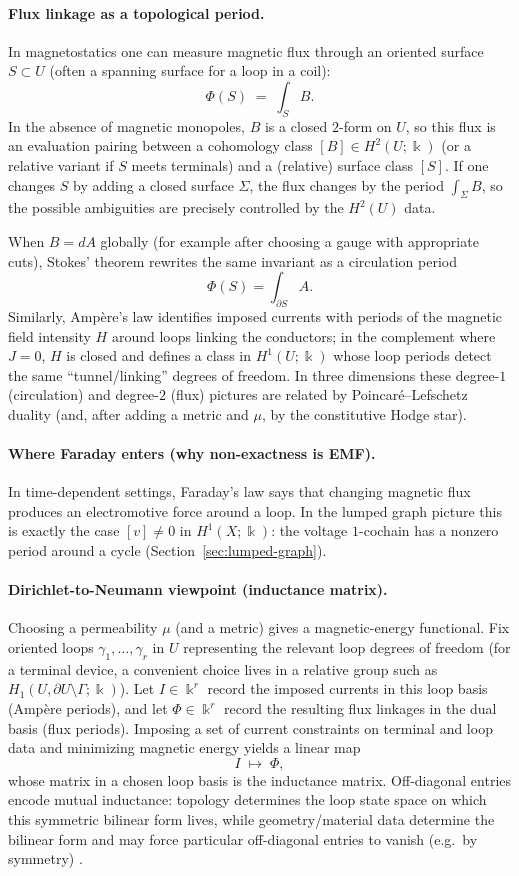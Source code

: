 \documentclass[11pt]{article}
\begin{document}
\paragraph{Flux linkage as a topological period.}
In magnetostatics one can measure magnetic flux through an oriented surface $S\subset U$ (often a spanning surface for a loop in a coil):
\[
\Phi(S)\;=\;\int_{S} B.
\]
In the absence of magnetic monopoles, $B$ is a closed $2$-form on $U$, so this flux is an evaluation pairing between a cohomology class $[B]\in H^2(U;\Bbbk)$ (or a relative variant if $S$ meets terminals) and a (relative) surface class $[S]$.
If one changes $S$ by adding a closed surface $\Sigma$, the flux changes by the period $\int_\Sigma B$, so the possible ambiguities are precisely controlled by the $H^2(U)$ data.

When $B=dA$ globally (for example after choosing a gauge with appropriate cuts), Stokes' theorem rewrites the same invariant as a circulation period
\[
\Phi(S)=\int_{\partial S} A.
\]
Similarly, Amp\`ere's law identifies imposed currents with periods of the magnetic field intensity $H$ around loops linking the conductors; in the complement where $J=0$, $H$ is closed and defines a class in $H^1(U;\Bbbk)$ whose loop periods detect the same ``tunnel/linking'' degrees of freedom.
In three dimensions these degree-$1$ (circulation) and degree-$2$ (flux) pictures are related by Poincar\'e--Lefschetz duality (and, after adding a metric and $\mu$, by the constitutive Hodge star).

\paragraph{Where Faraday enters (why non-exactness is EMF).}
In time-dependent settings, Faraday's law says that changing magnetic flux produces an electromotive force around a loop.
In the lumped graph picture this is exactly the case $[v]\neq 0$ in $H^1(X;\Bbbk)$: the voltage $1$-cochain has a nonzero period around a cycle (Section~\ref{sec:lumped-graph}).

\paragraph{Dirichlet-to-Neumann viewpoint (inductance matrix).}
Choosing a permeability $\mu$ (and a metric) gives a magnetic-energy functional.
Fix oriented loops $\gamma_1,\dots,\gamma_r$ in $U$ representing the relevant loop degrees of freedom (for a terminal device, a convenient choice lives in a relative group such as $H_1(U,\partial U\setminus \Gamma;\Bbbk)$).
Let $I\in\Bbbk^r$ record the imposed currents in this loop basis (Amp\`ere periods), and let $\Phi\in\Bbbk^r$ record the resulting flux linkages in the dual basis (flux periods).
Imposing a set of current constraints on terminal and loop data and minimizing magnetic energy yields a linear map
\[
I\;\longmapsto\;\Phi,
\]
whose matrix in a chosen loop basis is the inductance matrix.
Off-diagonal entries encode mutual inductance: topology determines the loop state space on which this symmetric bilinear form lives, while geometry/material data determine the bilinear form and may force particular off-diagonal entries to vanish (e.g.\ by symmetry) \cite{jackson_em_1998}.
\end{document}
